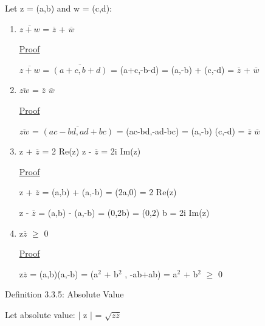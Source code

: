 	\qquad Let z = (a,b) and w = (c,d):
	\begin{enumerate}[label=(\alph*), leftmargin=2cm]
		\item $\overline{z+w}$ = $\overline{z}$ + $\overline{w}$

			{ \color{magenta} \underline{Proof} } 
			
				$\overline{z+w}$ = $\overline{(a+c,b+d)}$ = (a+c,-b-d)
				= (a,-b) + (c,-d) = $\overline{z}$ + $\overline{w}$

		\item $\overline{zw}$ = $\overline{z}$ $\overline{w}$

			{ \color{magenta} \underline{Proof} } 
			
				$\overline{zw}$ = $\overline{(ac-bd,ad+bc)}$ = (ac-bd,-ad-bc)
				= (a,-b) (c,-d) = $\overline{z}$ $\overline{w}$

		\item z + $\overline{z}$ = 2 Re(z) \qquad \qquad z - $\overline{z}$ = 2i Im(z)

			{ \color{magenta} \underline{Proof} } 
			
				z + $\overline{z}$ = (a,b) + (a,-b) = (2a,0) = 2 Re(z)

				z - $\overline{z}$ = (a,b) - (a,-b) = (0,2b) = (0,2) b = 2i Im(z)

		\item z$\overline{z}$ $\geq$ 0

			{ \color{magenta} \underline{Proof} } 
			
				z$\overline{z}$ = (a,b)(a,-b) = (a$^2$ + b$^2$ , -ab+ab) = a$^2$ + b$^2$ $\geq$ 0
	\end{enumerate}

{ \color{blue} Definition 3.3.5: Absolute Value } 
	
	\qquad Let absolute value: $|$ z $|$ = $\sqrt{z \overline{z}}$ \\

